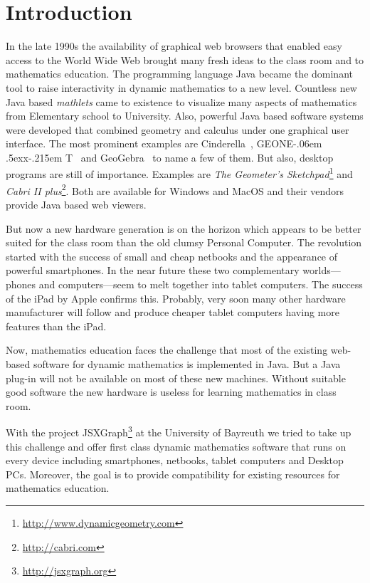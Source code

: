 \documentclass[12pt,a4paper]{article}%
\def\GEONExT{GEONE\kern-.06em \lower.5ex\hbox{x}\kern-.215em T}
\begin{document}
\section{Introduction}
In the late 1990s the availability of graphical web browsers that enabled easy access to the 
World Wide Web 
brought many fresh ideas to the class room and to mathematics education. 
The programming language Java became the dominant tool to raise interactivity in 
dynamic mathematics to a new level. 
Countless new Java based \emph{mathlets} came to existence 
to visualize many aspects of mathematics from Elementary school to University. 
Also, powerful Java based software systems were developed that combined geometry and calculus 
under one graphical user interface. The most prominent examples are 
Cinderella~\cite{kortenkamp1999}, \GEONExT~\cite{ehmann2003} and GeoGebra~\cite{hohenwarter2005} 
to name a few of them.
But also, desktop programs are still of importance. Examples are
{\sl The Geometer's Sketchpad}\footnote{\href{http://www.dynamicgeometry.com}{http://www.dynamicgeometry.com}} 
and {\sl Cabri II plus}\footnote{\href{http://cabri.com}{http://cabri.com}}.
Both are available for Windows and MacOS and their vendors provide Java based web viewers. 

But now a new hardware generation is on the horizon which appears to be better suited 
for the class room than the old clumsy Personal Computer. 
The revolution started with the success of small and cheap netbooks and the appearance of 
powerful smartphones. 
In the near future these two complementary worlds---phones and computers---seem to melt together into tablet computers. 
The success of the iPad by Apple confirms this. 
Probably, very soon many other hardware manufacturer will follow and produce 
cheaper tablet computers having more features than the iPad.

Now, mathematics education faces the challenge that most of the existing web-based software 
for dynamic mathematics is implemented in Java.  
But a Java plug-in will not be available on most of these new machines. 
Without suitable good software the new hardware is useless for learning mathematics 
in class room.

With the project JSXGraph\footnote{\href{http://jsxgraph.org}{http://jsxgraph.org}} 
at the University of Bayreuth we tried to take up 
this challenge and offer first class dynamic mathematics software that runs on 
every device including smartphones, netbooks, tablet computers and Desktop PCs. 
Moreover, the goal is to provide compatibility for existing resources for 
mathematics education. 
\end{document}
